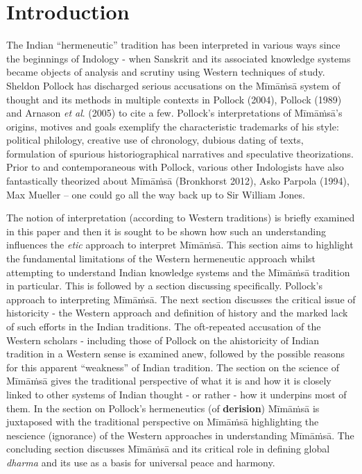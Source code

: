 \section*{Introduction}

The Indian “hermeneutic” tradition has been interpreted in various ways since the beginnings of Indology - when Sanskrit and its associated knowledge systems became objects of analysis and scrutiny using Western techniques of study. Sheldon Pollock has discharged serious accusations on the Mīmāṁsā system of thought and its methods in multiple contexts in Pollock (2004), Pollock (1989) and Arnason \textit{et al}. (2005) to cite a few. Pollock’s interpretations of Mīmāṁsā’s origins, motives and goals exemplify the characteristic trademarks of his style: political philology, creative use of chronology, dubious dating of texts, formulation of spurious historiographical narratives and speculative theorizations. Prior to and contemporaneous with Pollock, various other Indologists have also fantastically theorized about Mīmāṁsā (Bronkhorst 2012), Asko Parpola (1994), Max Mueller – one could go all the way back up to Sir William Jones.

The notion of interpretation (according to Western traditions) is briefly examined in this paper and then it is sought to be shown how such an understanding influences the \textit{etic} approach to interpret Mīmāṁsā. This section aims to highlight the fundamental limitations of the Western hermeneutic approach whilst attempting to understand Indian knowledge systems and the Mīmāṁsā tradition in particular. This is followed by a section discussing specifically. Pollock’s approach to interpreting Mīmāṁsā. The next section discusses the critical issue of historicity - the Western approach and definition of history and the marked lack of such efforts in the Indian traditions. The oft-repeated accusation of the Western scholars - including those of Pollock on the ahistoricity of Indian tradition in a Western sense is examined anew, followed by the possible reasons for this apparent “weakness” of Indian tradition. The section on the science of Mīmāṁsā gives the traditional perspective of what it is and how it is closely linked to other systems of Indian thought - or rather - how it underpins most of them. In the section on Pollock’s hermeneutics (of \textbf{derision}) Mīmāṁsā is juxtaposed with the traditional perspective on Mīmāṁsā highlighting the nescience (ignorance) of the Western approaches in understanding Mīmāṁsā. The concluding section discusses Mīmāṁsā and its critical role in defining global \textit{dharma} and its use as a basis for universal peace and harmony.

